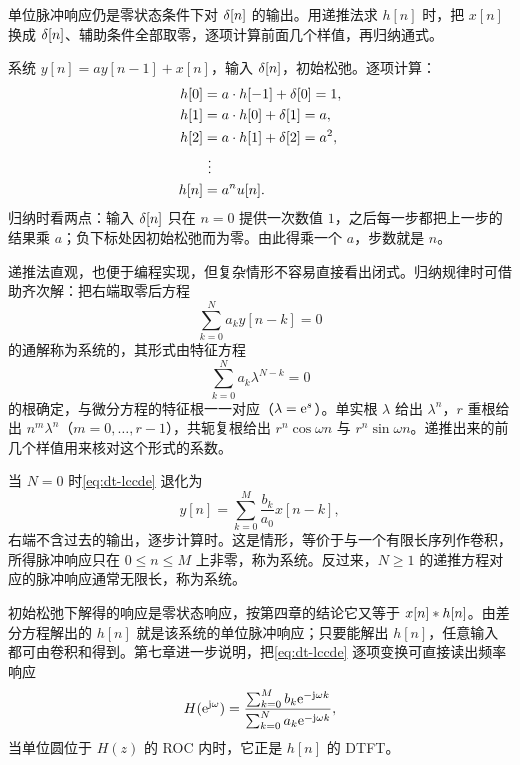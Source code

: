 单位脉冲响应仍是零状态条件下对 $\delta[n]$ 的输出。用递推法求 $h[n]$ 时，把 $x[n]$ 换成 $\delta[n]$、辅助条件全部取零，逐项计算前面几个样值，再归纳通式。

\begin{example}[一阶递推的脉冲响应]
  \label{eg:dt-recursive-impulse}
  系统 $y[n]=ay[n-1]+x[n]$，输入 $\delta[n]$，初始松弛。逐项计算：
  \begin{align*}
    h[0]&=a\cdot h[-1]+\delta[0]=1,\\
    h[1]&=a\cdot h[0]+\delta[1]=a,\\
    h[2]&=a\cdot h[1]+\delta[2]=a^2,\\
    &\ \vdots\\
    h[n]&=a^nu[n].
  \end{align*}
  归纳时看两点：输入 $\delta[n]$ 只在 $n=0$ 提供一次数值 $1$，之后每一步都把上一步的结果乘 $a$；负下标处因初始松弛而为零。由此得乘一个 $a$，步数就是 $n$。
\end{example}

递推法直观，也便于编程实现，但复杂情形不容易直接看出闭式。归纳规律时可借助齐次解：把右端取零后方程
\[
  \sum_{k=0}^{N}a_ky[n-k]=0
\]
的通解称为系统的，其形式由特征方程
\begin{equation}
  \sum_{k=0}^{N}a_k\lambda^{N-k}=0
  \label{eq:dt-characteristic-equation}
\end{equation}
的根确定，与微分方程的特征根一一对应（$\lambda=\mathrm{e}^{s}$）。单实根 $\lambda$ 给出 $\lambda^n$，$r$ 重根给出 $n^{m}\lambda^n$（$m=0,\ldots,r-1$），共轭复根给出 $r^n\cos\omega n$ 与 $r^n\sin\omega n$。递推出来的前几个样值用来核对这个形式的系数。

当 $N=0$ 时\cref{eq:dt-lccde} 退化为
\[
  y[n]=\sum_{k=0}^{M}\frac{b_k}{a_0}x[n-k],
\]
右端不含过去的输出，逐步计算时。这是情形，等价于与一个有限长序列作卷积，所得脉冲响应只在 $0\leq n\leq M$ 上非零，称为系统。反过来，$N\geq1$ 的递推方程对应的脉冲响应通常无限长，称为系统。

\begin{remark}[与时域卷积的关系]
  初始松弛下解得的响应是零状态响应，按第四章的结论它又等于 $x[n]\mathbin{\ast} h[n]$。由差分方程解出的 $h[n]$ 就是该系统的单位脉冲响应；只要能解出 $h[n]$，任意输入都可由卷积和得到。第七章进一步说明，把\cref{eq:dt-lccde} 逐项变换可直接读出频率响应
  \[
    H(\mathrm{e}^{\mathrm{j}\omega})
    =\frac{\sum_{k=0}^{M}b_k\mathrm{e}^{-\mathrm{j}\omega k}}{\sum_{k=0}^{N}a_k\mathrm{e}^{-\mathrm{j}\omega k}},
  \]
  当单位圆位于 $H(z)$ 的 ROC 内时，它正是 $h[n]$ 的 DTFT。
\end{remark}

